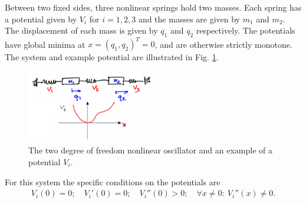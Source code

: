 \begin{ex}
	Between two fixed sides, three nonlinear springs hold two masses. Each spring has a potential given by $V_{i}$ for $i=1,2,3$ and the masses are given by $m_1$ and $m_2$. The displacement of each mass is given by $q_1$ and $q_2$ respectively. The potentials have global minima at $x=(q_1, q_2)^T=0$, and are otherwise strictly monotone. The system and example potential are illustrated in Fig. \ref{fig:2dof_oscillator_hamiltonian}.
	\begin{figure}[h!]
		\centering
		\includegraphics[width=0.5\textwidth]{figures/ch8/4_2dof_oscillator_hamiltonian.png}
		\caption{The two degree of freedom nonlinear oscillator and an example of a potential $V_i$.}
		\label{fig:2dof_oscillator_hamiltonian}
	\end{figure}
	
	For this system the specific conditions on the potentials are
	\begin{align}
		V_{i}(0) =0;\quad V_{i}'(0)=0;\quad V_{i}''(0)>0;\quad \forall x\neq 0:\ V_{i}''(x)\neq 0 . \label{eq8:2dof_conditions}
	\end{align}


\end{ex}
